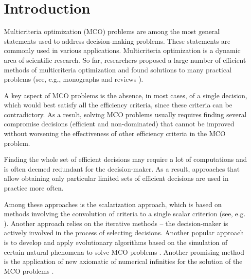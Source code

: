 \documentclass[smallextended]{svjour3}       %
\begin{document}
\section{Introduction}
\label{sec:1}

Multicriteria optimization (MCO) problems are among the most general statements used to address decision-making problems. These statements are commonly used in various applications. Multicriteria optimization is a dynamic area of scientific research. So far, researchers proposed a large number of efficient methods of multicriteria optimization and found solutions to many practical problems (see, e.g., monographs \cite{c1,c2,c3,c4,c5} and reviews \cite{c6,c7,c8,c9}).

A key aspect of MCO problems is the absence, in most cases, of a single decision, which would best satisfy all the efficiency criteria, since these criteria can be contradictory. As a result, solving MCO problems usually requires finding several compromise decisions (efficient and non-dominated) that cannot be improved without worsening the effectiveness of other efficiency criteria in the MCO problem.

Finding the whole set of efficient decisions may require a lot of computations and is often deemed redundant for the decision-maker. As a result, approaches that allow obtaining only particular limited sets of efficient decisions are used in practice more often.

Among these approaches is the scalarization approach, which is based on methods involving the convolution of criteria to a single scalar criterion (see, e.g. \cite{c2,c14}). Another approach relies on the iterative methods \cite{c6,c10} -- the decision-maker is actively involved in the process of selecting decisions. Another popular approach is to develop and apply evolutionary algorithms based on the simulation of certain natural phenomena to solve MCO problems \cite{c10,c11,c12,c13}. Another promising method is the application of new axiomatic of numerical infinities for the solution of the MCO problems \cite{c57,c58,c59}.
\end{document}
